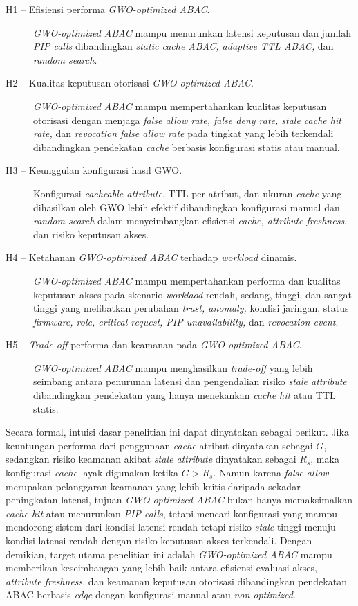 \begin{description}
    \item [H1 -- Efisiensi performa \textit{GWO-optimized ABAC}.] \textit{GWO-optimized ABAC} mampu menurunkan latensi keputusan dan jumlah \textit{PIP calls} dibandingkan \textit{static cache ABAC, adaptive TTL ABAC,} dan \textit{random search}.
    \item [H2 -- Kualitas keputusan otorisasi \textit{GWO-optimized ABAC}.] \textit{GWO-optimized ABAC} mampu mempertahankan kualitas keputusan otorisasi dengan menjaga \textit{false allow rate, false deny rate, stale cache hit rate,} dan \textit{revocation false allow rate} pada tingkat yang lebih terkendali dibandingkan pendekatan \textit{cache} berbasis konfigurasi statis atau manual.
    \item [H3 -- Keunggulan konfigurasi hasil GWO.] Konfigurasi \textit{cacheable attribute}, TTL per atribut, dan ukuran \textit{cache} yang dihasilkan oleh GWO lebih efektif dibandingkan konfigurasi manual dan \textit{random search} dalam menyeimbangkan efisiensi \textit{cache, attribute freshness}, dan risiko keputusan akses.
    \item [H4 -- Ketahanan \textit{GWO-optimized ABAC} terhadap \textit{workload} dinamis.] \textit{GWO-optimized ABAC} mampu mempertahankan performa dan kualitas keputusan akses pada skenario \textit{worklaod} rendah, sedang, tinggi, dan sangat tinggi yang melibatkan perubahan \textit{trust, anomaly,} kondisi jaringan, status \textit{firmware, role, critical request, PIP unavailability,} dan \textit{revocation event}.
    \item [H5 -- \textit{Trade-off} performa dan keamanan pada \textit{GWO-optimized ABAC}.] \textit{GWO-optimized ABAC} mampu menghasilkan \textit{trade-off} yang lebih seimbang antara penurunan latensi dan pengendalian risiko \textit{stale attribute} dibandingkan pendekatan yang hanya menekankan \textit{cache hit} atau TTL statis.
\end{description}

Secara formal, intuisi dasar penelitian ini dapat dinyatakan sebagai berikut. Jika keuntungan performa dari penggunaan \textit{cache} atribut dinyatakan sebagai $G$, sedangkan risiko keamanan akibat \textit{stale attribute} dinyatakan sebagai $R_s$, maka konfigurasi \textit{cache} layak digunakan ketika $G > R_s$. Namun karena \textit{false allow} merupakan pelanggaran keamanan yang lebih kritis daripada sekadar peningkatan latensi, tujuan \textit{GWO-optimized ABAC} bukan hanya memaksimalkan \textit{cache hit} atau menurunkan \textit{PIP calls}, tetapi mencari konfigurasi yang mampu mendorong sistem dari kondisi latensi rendah tetapi risiko \textit{stale} tinggi menuju kondisi latensi rendah dengan risiko keputusan akses terkendali. Dengan demikian, target utama penelitian ini adalah \textit{GWO-optimized ABAC} mampu memberikan keseimbangan yang lebih baik antara efisiensi evaluasi akses, \textit{attribute freshness}, dan keamanan keputusan otorisasi dibandingkan pendekatan ABAC berbasis \textit{edge} dengan konfigurasi manual atau \textit{non-optimized}.